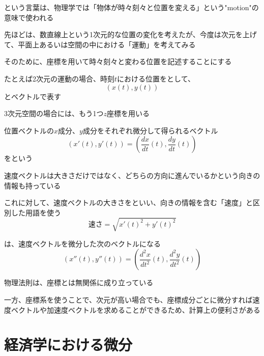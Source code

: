 \documentclass[../book_jiriki_calc]{subfiles}
\begin{document}
という言葉は、物理学では「物体が時々刻々と位置を変える」という"motion"の意味で使われる

\br

先ほどは、数直線上という1次元的な位置の変化を考えたが、今度は次元を上げて、平面上あるいは空間の中における「運動」を考えてみる

\br

そのために、座標を用いて時々刻々と変わる位置を記述することにする

たとえば2次元の運動の場合、時刻$t$における位置をとして、
\begin{equation}
  \left( x(t), y(t) \right)
\end{equation}
とベクトルで表す

3次元空間の場合には、もう1つ$z$座標を用いる

\br

位置ベクトルの$x$成分、$y$成分をそれぞれ微分して得られるベクトル
\begin{equation}
  \left( x'(t), y'(t) \right) = \left( \dfrac{dx}{dt}(t), \dfrac{dy}{dt}(t) \right)
\end{equation}
をという

速度ベクトルは大きさだけではなく、どちらの方向に進んでいるかという向きの情報も持っている

\br

これに対して、速度ベクトルの大きさをといい、向きの情報を含む「速度」と区別した用語を使う
\begin{equation}
  \text{速さ} = \sqrt{x'(t)^2 + y'(t)^2}
\end{equation}

\br

は、速度ベクトルを微分した次のベクトルになる
\begin{equation}
  \left( x''(t), y''(t) \right) = \left( \dfrac{d^2x}{dt^2}(t), \dfrac{d^2y}{dt^2}(t) \right)
\end{equation}

\sectionline

物理法則は、座標とは無関係に成り立っている

一方、座標系を使うことで、次元が高い場合でも、座標成分ごとに微分すれば速度ベクトルや加速度ベクトルを求めることができるため、計算上の便利さがある

\section{経済学における微分}
\end{document}
